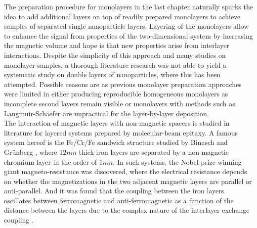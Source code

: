 \documentclass[\main/dresen_thesis.tex]{subfiles}
\begin{document}
  The preparation procedure for monolayers in the last chapter naturally sparks the idea to add additional layers on top of readily prepared monolayers to achieve samples of separated single nanoparticle layers.
  Layering of the monolayers allow to enhance the signal from properties of the two-dimensional system by increasing the magnetic volume and hope is that new properties arise from interlayer interactions.
  Despite the simplicity of this approach and many studies on monolayer samples, a thorough literature research was not able to yield a systematic study on double layers of nanoparticles, where this has been attempted.
  Possible reasons are as previous monolayer preparation approaches were limited in either producing reproducible homogeneous monolayers as incomplete second layers remain visible \cite{Mishra_2015_Polar, Bodnarchuk_2010_Large} or monolayers with methods such as Langmuir-Schaefer \cite{Ukleev_2017_Polar} are unpractical for the layer-by-layer deposition.
  \\

  The interaction of magnetic layers with non-magnetic spacers is studied in literature for layered systems prepared by molecular-beam epitaxy.
  A famous system hereof is the Fe/Cr/Fe sandwich structure studied by Binasch and Gr\"unberg \etal \cite{Binasch_1989_Enhan}, where $12 \unit{nm}$ thick iron layers are separated by a non-magnetic chromium layer in the order of  $1 \unit{nm}$.
  In such systems, the Nobel prize winning giant magneto-resistance was discovered, where the electrical resistance depends on whether the magnetizations in the two adjacent magnetic layers are parallel or anti-parallel.
  And it was found that the coupling between the iron layers oscillates between ferromagnetic and anti-ferromagnetic as a function of the distance between the layers due to the complex nature of the interlayer exchange coupling \cite{Demokritov_1998_Biqua}.
\end{document}
